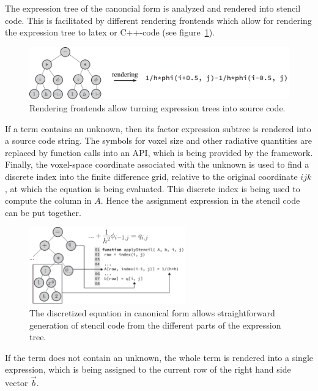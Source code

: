 The expression tree of the canoncial form is analyzed and rendered into stencil code. This is facilitated by different rendering frontends which allow for rendering the expression tree to latex or C++-code (see figure~\ref{fig:pn_math_expression_tree_rendering}).
\begin{figure}[h]
\centering
\includegraphics[width=1.0\textwidth]{04_pn_method/figures/fig_car_rendering.pdf}
\caption{Rendering frontends allow turning expression trees into source code.}
\label{fig:pn_math_expression_tree_rendering}
\end{figure}

If a term contains an unknown, then its factor expression subtree is rendered into a source code string. The symbols for voxel size and other radiative quantities are replaced by function calls into an API, which is being provided by the framework. Finally, the voxel-space coordinate associated with the unknown is used to find a discrete index into the finite difference grid, relative to the original coordinate $ijk$, at which the equation is being evaluated. This discrete index is being used to compute the column in $A$. Hence the assignment expression in the stencil code can be put together.
\begin{figure}[h]
\centering
\includegraphics[width=0.6\textwidth]{04_pn_method/figures/fig_car_canonical_to_code.pdf}
\caption{The discretized equation in canonical form allows straightforward generation of stencil code from the different parts of the expression tree.}
\label{fig:pn_discretization_codegen}
\end{figure}

If the term does not contain an unknown, the whole term is rendered into a single expression, which is being assigned to the current row of the right hand side vector $\vec{b}$.

